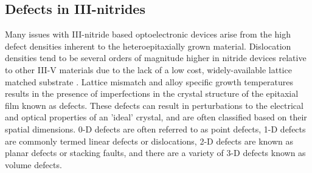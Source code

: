 \subsection{Defects in III-nitrides}  %
\label{section1.1.4}
Many issues with III-nitride based optoelectronic devices arise from the high defect densities inherent to the heteroepitaxially grown material. Dislocation densities tend to be several orders of magnitude higher in nitride devices relative to other III-V materials due to the lack of a low cost, widely-available lattice matched substrate \cite{Bennett2010b}. Lattice mismatch and alloy specific growth temperatures results in the presence of imperfections in the crystal structure of the epitaxial film known as defects. These defects can result in perturbations to the electrical and optical properties of an 'ideal' crystal, and are often classified based on their spatial dimensions. 0-D defects are often referred to as point defects, 1-D defects are commonly termed linear defects or dislocations, 2-D defects are known as planar defects or stacking faults, and there are a variety of 3-D defects known as volume defects.

